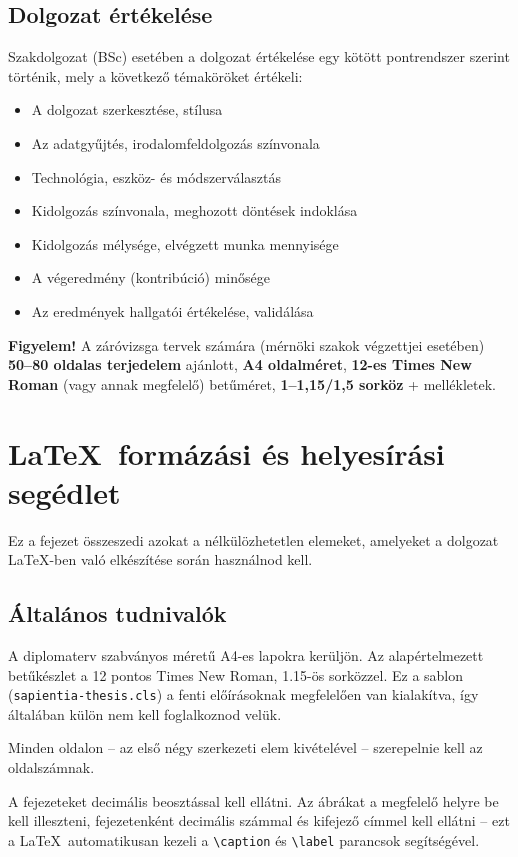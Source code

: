 \documentclass{sapientia-thesis}
\begin{document}
\subsection{Dolgozat értékelése}
Szakdolgozat (BSc) esetében a dolgozat értékelése egy kötött pontrendszer szerint történik, mely a következő témaköröket értékeli:
\begin{itemize}
  \item A dolgozat szerkesztése, stílusa
  \item Az adatgyűjtés, irodalomfeldolgozás színvonala
  \item Technológia, eszköz- és módszerválasztás
  \item Kidolgozás színvonala, meghozott döntések indoklása
  \item Kidolgozás mélysége, elvégzett munka mennyisége
  \item A végeredmény (kontribúció) minősége
  \item Az eredmények hallgatói értékelése, validálása
\end{itemize}

\bigskip
\noindent\textbf{Figyelem!} A záróvizsga tervek számára (mérnöki szakok végzettjei esetében) \textbf{50--80 oldalas terjedelem} ajánlott, \textbf{A4 oldalméret}, \textbf{12-es Times New Roman} (vagy annak megfelelő) betűméret, \textbf{1--1,15/1,5 sorköz} + mellékletek.


\section{\LaTeX\ formázási és helyesírási segédlet}
Ez a fejezet összeszedi azokat a nélkülözhetetlen elemeket, amelyeket a dolgozat \LaTeX-ben való elkészítése során használnod kell.

\subsection{Általános tudnivalók}
A diplomaterv szabványos méretű A4-es lapokra kerüljön. Az alapértelmezett betűkészlet a 12 pontos Times New Roman, 1.15-ös sorközzel. Ez a sablon (\texttt{sapientia-thesis.cls}) a fenti előírásoknak megfelelően van kialakítva, így általában külön nem kell foglalkoznod velük.

Minden oldalon -- az első négy szerkezeti elem kivételével -- szerepelnie kell az oldalszámnak.

A fejezeteket decimális beosztással kell ellátni. Az ábrákat a megfelelő helyre be kell illeszteni, fejezetenként decimális számmal és kifejező címmel kell ellátni -- ezt a \LaTeX\ automatikusan kezeli a \verb|\caption| és \verb|\label| parancsok segítségével.
\end{document}

